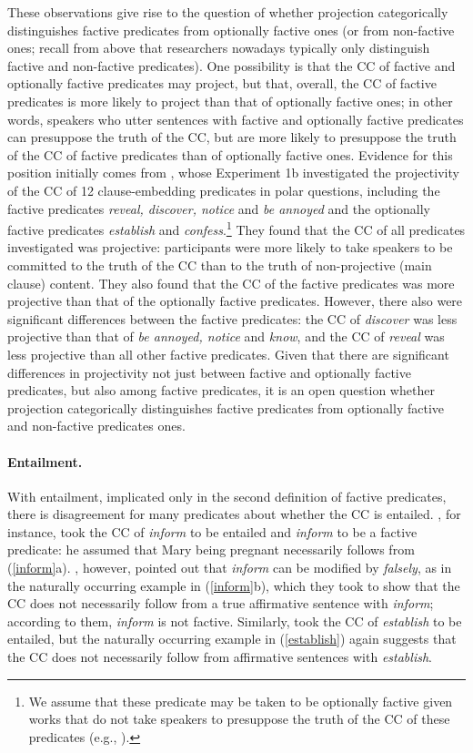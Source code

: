 \documentclass[11pt,fleqn]{article}
\newcommand{\6}{\mbox{$[\hspace*{-.6mm}[$}}
\newcommand{\9}{\mbox{$]\hspace*{-.6mm}]$}}
\begin{document}
These observations give rise to the question of whether projection categorically distinguishes factive predicates from optionally factive ones (or from non-factive ones; recall from above that researchers nowadays typically only distinguish factive and non-factive predicates). One possibility is that the CC of factive and optionally factive predicates may project, but that, overall, the CC of factive predicates is more likely to project than that of optionally factive ones; in other words, speakers who utter sentences with factive and optionally factive predicates can presuppose the truth of the CC, but are more likely to presuppose the truth of the CC of factive predicates than of optionally factive ones. Evidence for this position initially comes from \citealt*{tbd-variability}, whose Experiment 1b investigated the projectivity of the CC of 12 clause-embedding predicates in polar questions, including the factive predicates {\em reveal, discover, notice} and {\em be annoyed} and the optionally factive predicates {\em establish} and {\em confess}.\footnote{We assume that these predicate may be taken to be optionally factive given works that do not take speakers to presuppose the truth of the CC of these predicates (e.g., \citealt{wyse,swanson2012,karttunen2016}).} They found that the CC of all predicates investigated was projective: participants were more likely to take speakers to be committed to the truth of the CC than to the truth of non-projective (main clause) content. They also found that the CC of the factive predicates was more projective than that of the optionally factive predicates. However, there also were significant differences between the factive predicates: the CC of {\em discover} was less projective than that of {\em be annoyed, notice} and {\em know}, and the CC of {\em reveal} was less projective than all other factive predicates. Given that there are significant differences in projectivity not just between factive and optionally factive predicates, but also among factive predicates, it is an open question whether projection categorically distinguishes factive predicates from optionally factive and non-factive predicates ones.

\paragraph{Entailment.} With entailment, implicated only in the second definition of factive predicates, there is disagreement for many predicates about whether the CC is entailed. \citet[139]{schlenker10}, for instance, took the CC of {\em inform} to be entailed and {\em inform} to be a factive predicate: he assumed that Mary being pregnant necessarily follows from (\ref{inform}a). \citet[76]{anand-hacquard2014}, however, pointed out that {\em inform} can be modified by {\em falsely}, as in the naturally occurring example in (\ref{inform}b), which they took to show that the CC does not necessarily follow from a true affirmative sentence with {\em inform}; according to them, {\em inform} is not factive. Similarly, \citet{swanson2012} took the CC of {\em establish} to be entailed, but the naturally occurring example in (\ref{establish}) again suggests that the CC does not necessarily follow from affirmative sentences with {\em establish}.
\end{document}
